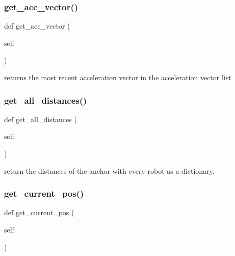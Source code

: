 \subsubsection{\texorpdfstring{get\+\_\+acc\+\_\+vector()}{get\_acc\_vector()}}
{\footnotesize\ttfamily def get\+\_\+acc\+\_\+vector (\begin{DoxyParamCaption}\item[{}]{self }\end{DoxyParamCaption})}

\begin{DoxyVerb}returns the most recent acceleration vector in the acceleration vector list\end{DoxyVerb}
 \mbox{\label{classmovingentity_1_1_moving_entity_a8497086c897585b6ee2234e8728e69e5}} 
\subsubsection{\texorpdfstring{get\+\_\+all\+\_\+distances()}{get\_all\_distances()}}
{\footnotesize\ttfamily def get\+\_\+all\+\_\+distances (\begin{DoxyParamCaption}\item[{}]{self }\end{DoxyParamCaption})}

\begin{DoxyVerb}return the distances of the anchor with every robot as a dictionary.\end{DoxyVerb}
 \mbox{\label{classmovingentity_1_1_moving_entity_a2d32bac446feb8ad06df10e2af16f595}} 
\subsubsection{\texorpdfstring{get\+\_\+current\+\_\+pos()}{get\_current\_pos()}}
{\footnotesize\ttfamily def get\+\_\+current\+\_\+pos (\begin{DoxyParamCaption}\item[{}]{self }\end{DoxyParamCaption})}

